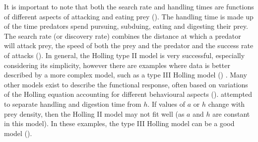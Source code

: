 \documentclass{article}
\begin{document}
It is important to note that both the search rate and handling times are functions of different aspects of attacking and eating prey (\cite{Hassel1976TheDeath-Rate}). The handling time is made up of the time predators spend pursuing, subduing, eating and digesting their prey. The search rate (or discovery rate) combines the distance at which a predator will attack prey, the speed of both the prey and the predator and the success rate of attacks (\cite{Holling1966}). In general, the Holling type II model is very successful, especially considering its simplicity, however there are examples where data is better described by a more complex model, such as a type III Holling model (\cite{Hassel1976TheDeath-Rate}) . 
Many other models exist to describe the functional response, often based on variations of the Holling equation accounting for different behavioural aspects  (\cite{Jeschke2002PredatorPrey}). \cite{Jeschke2002PredatorPrey} attempted to separate handling and digestion time from  $h$.  If values of $a$ or $h$ change with prey density, then the Holling II model may not fit well  (as $a$ and $h$ are constant in this model). In these examples, the type III Holling model can be a good model (\cite{Hassel1976TheDeath-Rate}). 
\end{document}
